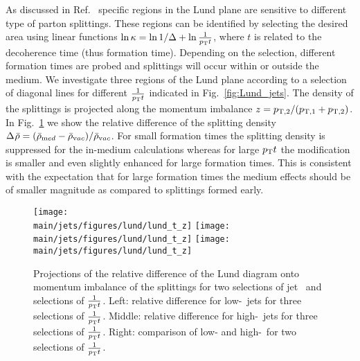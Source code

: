 
As discussed in Ref.~\cite{Andrews:2018jcm} specific regions in the Lund plane are sensitive to different type of parton splittings. 
These regions can be identified by selecting the desired area using linear functions $\ln\kappa = \ln1/\Delta + \ln \frac{1}{p_{\rm T} t}$, where $t$ is related to the decoherence time (thus formation time).
Depending on the selection, different formation times are probed and splittings will occur within or outside the medium.
We investigate three regions of the Lund plane according to a selection of diagonal lines for different $\frac{1}{p_{\rm T} t}$ indicated in Fig.~\ref{fig:Lund_jets}.
The density of the splittings is projected along the momentum imbalance $z = p_{\rm T,2}/(p_{\rm T,1} + p_{\rm T,2})$.
In Fig.~\ref{fig:Lund_projections_z} we show the relative difference of the splitting density $\Delta_{\rm}\bar{\rho} = (\bar{\rho}_{\mathrm med} - \bar{\rho}_{\mathrm vac})/\bar{\rho}_{\mathrm vac}$.
For small formation times the splitting density is suppressed for the in-medium calculations whereas for large $p_{\rm T} t$ the modification is smaller and even slightly enhanced for large formation times.
This is consistent with the expectation that for large formation times the medium effects should be of smaller magnitude as compared to splittings formed early.
%
\begin{figure}[ht]
	\centering
	\texttt{[image: \\main/jets/figures/lund/lund\_t\_z]}
	\texttt{[image: \\main/jets/figures/lund/lund\_t\_z]}
	\texttt{[image: \\main/jets/figures/lund/lund\_t\_z]}
	\caption{Projections of the relative difference of the Lund diagram onto momentum imbalance of the splittings for two selections of jet \pt\ and selections of $\frac{1}{p_{\rm T} t}$.
	Left: relative difference for low-\pt\ jets for three selections of $\frac{1}{p_{\rm T} t}$.
	Middle: relative difference for high-\pt\ jets for three selections of $\frac{1}{p_{\rm T} t}$.
 Right: comparison of low- and high-\pt\ for two selections of $\frac{1}{p_{\rm T} t}$.
	}
	\label{fig:Lund_projections_z}
\end{figure}





